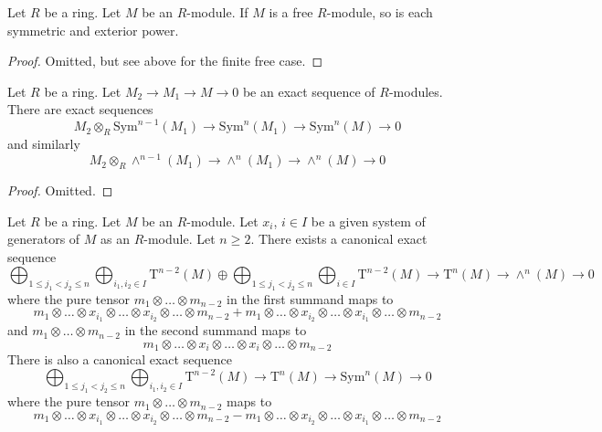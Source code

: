 \begin{lemma}
\label{lemma-free-tensor-algebra}
Let $R$ be a ring. Let $M$ be an $R$-module.
If $M$ is a free $R$-module, so is each symmetric and exterior power.
\end{lemma}

\begin{proof}
Omitted, but see above for the finite free case.
\end{proof}

\begin{lemma}
\label{lemma-presentation-sym-exterior}
Let $R$ be a ring.
Let $M_2 \to M_1 \to M\to 0$ be an exact sequence of $R$-modules.
There are exact sequences
$$
M_2 \otimes_R \text{Sym}^{n - 1}(M_1)
\to
\text{Sym}^n(M_1)
\to
\text{Sym}^n(M)
\to
0
$$
and similarly
$$
M_2 \otimes_R \wedge^{n - 1}(M_1)
\to
\wedge^n(M_1)
\to
\wedge^n(M)
\to
0
$$
\end{lemma}

\begin{proof}
Omitted.
\end{proof}

\begin{lemma}
\label{lemma-present-sym-wedge}
Let $R$ be a ring.
Let $M$ be an $R$-module.
Let $x_i$, $i \in I$ be a given system of generators of
$M$ as an $R$-module. Let $n \geq 2$.
There exists a canonical exact sequence
$$
\bigoplus_{1 \leq j_1 < j_2 \leq n}
\bigoplus_{i_1, i_2 \in I}
\text{T}^{n - 2}(M)
\oplus
\bigoplus_{1 \leq j_1 < j_2 \leq n}
\bigoplus_{i \in I}
\text{T}^{n - 2}(M)
\to
\text{T}^n(M)
\to
\wedge^n(M)
\to
0
$$
where the pure tensor $m_1 \otimes \ldots \otimes m_{n - 2}$ in the first
summand maps to
$$
m_1 \otimes \ldots \otimes x_{i_1} \otimes \ldots
\otimes x_{i_2} \otimes \ldots \otimes m_{n - 2}
+
m_1 \otimes \ldots \otimes x_{i_2} \otimes \ldots
\otimes x_{i_1} \otimes \ldots \otimes m_{n - 2}
$$
and $m_1 \otimes \ldots \otimes m_{n - 2}$ in the second
summand maps to
$$
m_1 \otimes \ldots \otimes x_i \otimes \ldots
\otimes x_i \otimes \ldots \otimes m_{n - 2}
$$
There is also a canonical exact sequence
$$
\bigoplus_{1 \leq j_1 < j_2 \leq n}
\bigoplus_{i_1, i_2 \in I}
\text{T}^{n - 2}(M)
\to
\text{T}^n(M)
\to
\text{Sym}^n(M)
\to
0
$$
where the pure tensor $m_1 \otimes \ldots \otimes m_{n - 2}$ maps to
$$
m_1 \otimes \ldots \otimes x_{i_1} \otimes \ldots
\otimes x_{i_2} \otimes \ldots \otimes m_{n - 2}
-
m_1 \otimes \ldots \otimes x_{i_2} \otimes \ldots
\otimes x_{i_1} \otimes \ldots \otimes m_{n - 2}
$$
\end{lemma}

